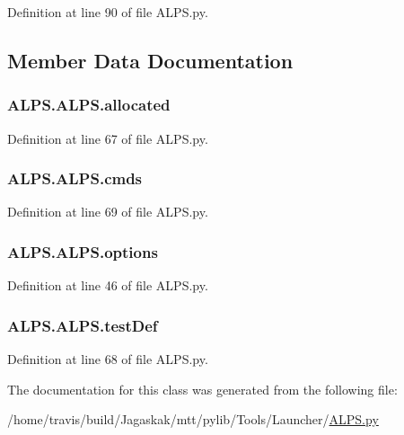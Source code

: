Definition at line 90 of file A\-L\-P\-S.\-py.



\subsection{Member Data Documentation}
\hypertarget{classALPS_1_1ALPS_ac371dce53e8c120f7031259025562bdb}{
\subsubsection[{allocated}]{\setlength{\rightskip}{0pt plus 5cm}A\-L\-P\-S.\-A\-L\-P\-S.\-allocated}}\label{classALPS_1_1ALPS_ac371dce53e8c120f7031259025562bdb}


Definition at line 67 of file A\-L\-P\-S.\-py.

\hypertarget{classALPS_1_1ALPS_a64bae95ba692ef4df06f716692b50ee9}{
\subsubsection[{cmds}]{\setlength{\rightskip}{0pt plus 5cm}A\-L\-P\-S.\-A\-L\-P\-S.\-cmds}}\label{classALPS_1_1ALPS_a64bae95ba692ef4df06f716692b50ee9}


Definition at line 69 of file A\-L\-P\-S.\-py.

\hypertarget{classALPS_1_1ALPS_a24dfa9b508f507c4cb6148f10a081555}{
\subsubsection[{options}]{\setlength{\rightskip}{0pt plus 5cm}A\-L\-P\-S.\-A\-L\-P\-S.\-options}}\label{classALPS_1_1ALPS_a24dfa9b508f507c4cb6148f10a081555}


Definition at line 46 of file A\-L\-P\-S.\-py.

\hypertarget{classALPS_1_1ALPS_a839c4f84a46683221d51004c08345ff2}{
\subsubsection[{test\-Def}]{\setlength{\rightskip}{0pt plus 5cm}A\-L\-P\-S.\-A\-L\-P\-S.\-test\-Def}}\label{classALPS_1_1ALPS_a839c4f84a46683221d51004c08345ff2}


Definition at line 68 of file A\-L\-P\-S.\-py.



The documentation for this class was generated from the following file\-:\begin{DoxyCompactItemize}
\item 
/home/travis/build/\-Jagaskak/mtt/pylib/\-Tools/\-Launcher/\hyperlink{ALPS_8py}{A\-L\-P\-S.\-py}\end{DoxyCompactItemize}
